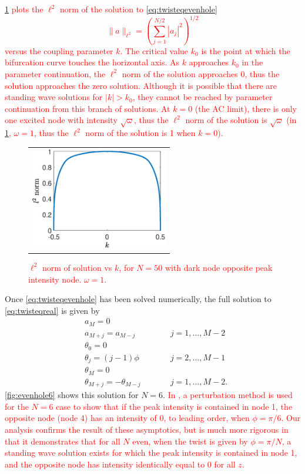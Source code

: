 \documentclass[reprint, amsmath,amssymb,aps,pra]{revtex4-2}
\renewcommand{\revised}[1]{ \textcolor{red}{#1} }
\begin{document}
\revised{
\cref{fig:evenbif} plots the $\ell^2$ norm of the solution to \cref{eq:twisteqevenhole}
\begin{equation}
\| a \|_{\ell^2} = \left( \sum_{j=1}^{N/2} |a_j|^2 \right)^{1/2}
\end{equation}
 versus the coupling parameter $k$. The critical value $k_0$ is the point at which the bifurcation curve touches the horizontal axis. As $k$ approaches $k_0$ in the parameter continuation, the $\ell^2$ norm of the solution approaches 0, thus the solution approaches the zero solution. Although it is possible that there are standing wave solutions for $|k| > k_0$, they cannot be reached by parameter continuation from this branch of solutions. At $k = 0$ (the AC limit), there is only one excited node with intensity $\sqrt{\omega}$, thus the $\ell^2$ norm of the solution is $\sqrt{\omega}$ (in \cref{fig:evenbif}, $\omega = 1$, thus the $\ell^2$ norm of the solution is 1 when $k = 0$).
\begin{figure}
\begin{center}
\begin{tabular}{c}
\includegraphics[width=6cm]{evenbif50.eps} 
\end{tabular}
\end{center}
\caption{$\ell^2$ norm of solution vs $k$, for $N = 50$ with dark node opposite peak intensity node. $\omega = 1$.}
\label{fig:evenbif}
\end{figure}
}

Once \cref{eq:twisteqevenhole} has been solved numerically, the full solution to \cref{eq:twisteqreal} is given by
\begin{align*}
&a_M = 0 \\
&a_{M+j} = a_{M-j} && \qquad j = 1, \dots, M-2 \\
&\theta_0 = 0 \\
&\theta_j = (j-1)\phi && \qquad  j = 2, \dots, M-1 \\
&\theta_M = 0 \\
&\theta_{M+j} = -\theta_{M-j} && \qquad j = 1, \dots, M-2.
\end{align*}
\cref{fig:evenhole6} shows this solution for $N=6$. \revised{In \cite{castro2016}, a perturbation method is used for the $N=6$ case to show that if the peak intensity is contained in node 1, the opposite node (node 4) has an intensity of 0, to leading order, when $\phi=\pi/6$. Our analysis confirms the result of these asymptotics, but is much more rigorous in that it demonstrates that for all $N$ even, when the twist is given by $\phi = \pi/N$, a standing wave solution exists for which the peak intensity is contained in node 1, and the opposite node has intensity identically equal to 0 for all $z$. }
\end{document}
